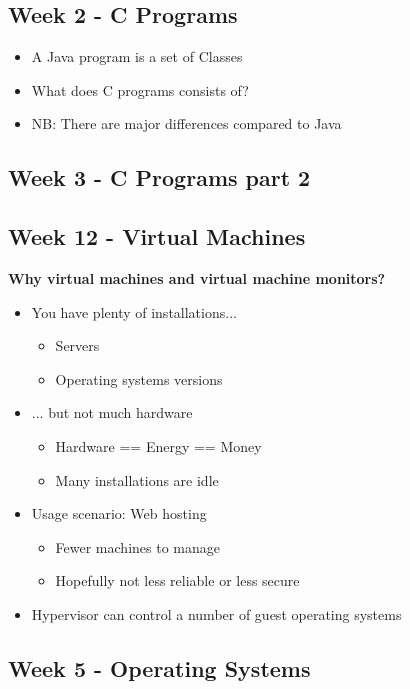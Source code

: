 
\subsection*{Week 2 - C Programs}
\begin{itemize}
\item A Java program is a set of Classes
\item What does C programs consists of?
\item NB: There are major differences compared to Java
\end{itemize}


\subsection*{Week 3 - C Programs part 2}






\subsection*{Week 12 - Virtual Machines}
\textbf{Why virtual machines and virtual machine monitors?}

\begin{itemize}
	\item You have plenty of installations...
	\begin{itemize}
		\item Servers
		\item Operating systems versions
	\end{itemize}

	\item ... but not much hardware
	\begin{itemize}
		\item Hardware == Energy == Money
		\item Many installations are idle
	\end{itemize}
	\item Usage scenario: Web hosting
	\begin{itemize}
		\item Fewer machines to manage
		\item Hopefully not less reliable or less secure
	\end{itemize}
	\item Hypervisor can control a number of guest operating systems
\end{itemize}

\subsection*{Week 5 - Operating Systems}





